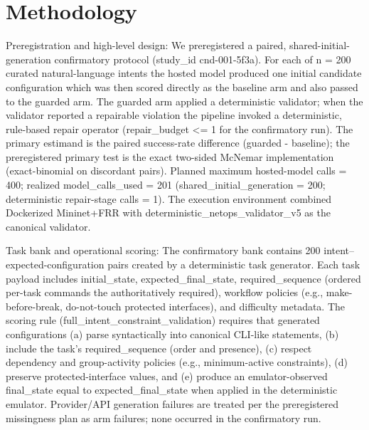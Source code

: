 \documentclass[conference]{IEEEtran}
\begin{document}
\section{Methodology}
Preregistration and high-level design: We preregistered a paired, shared-initial-generation confirmatory protocol (study\_id cnd-001-5f3a). For each of n = 200 curated natural-language intents the hosted model produced one initial candidate configuration which was then scored directly as the baseline arm and also passed to the guarded arm. The guarded arm applied a deterministic validator; when the validator reported a repairable violation the pipeline invoked a deterministic, rule-based repair operator (repair\_budget <= 1 for the confirmatory run). The primary estimand is the paired success-rate difference (guarded - baseline); the preregistered primary test is the exact two-sided McNemar implementation (exact-binomial on discordant pairs). Planned maximum hosted-model calls = 400; realized model\_calls\_used = 201 (shared\_initial\_generation = 200; deterministic repair-stage calls = 1). The execution environment combined Dockerized Mininet+FRR with deterministic\_netops\_validator\_v5 as the canonical validator.

Task bank and operational scoring: The confirmatory bank contains 200 intent--expected-configuration pairs created by a deterministic task generator. Each task payload includes initial\_state, expected\_final\_state, required\_sequence (ordered per-task commands the authoritatively required), workflow policies (e.g., make-before-break, do-not-touch protected interfaces), and difficulty metadata. The scoring rule (full\_intent\_constraint\_validation) requires that generated configurations (a) parse syntactically into canonical CLI-like statements, (b) include the task's required\_sequence (order and presence), (c) respect dependency and group-activity policies (e.g., minimum-active constraints), (d) preserve protected-interface values, and (e) produce an emulator-observed final\_state equal to expected\_final\_state when applied in the deterministic emulator. Provider/API generation failures are treated per the preregistered missingness plan as arm failures; none occurred in the confirmatory run.
\end{document}
